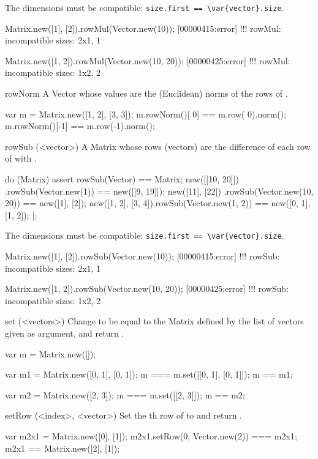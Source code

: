 \begin{urbiscriptapi}
  The dimensions must be compatible:
  \lstinline|size.first == \var{vector}.size|.
\begin{urbiscript}
Matrix.new([1], [2]).rowMul(Vector.new(10));
[00000415:error] !!! rowMul: incompatible sizes: 2x1, 1

Matrix.new([1, 2]).rowMul(Vector.new(10, 20));
[00000425:error] !!! rowMul: incompatible sizes: 1x2, 2
\end{urbiscript}


\item[rowNorm]%
  A Vector whose values are the (Euclidean) norms of the rows of \this.
\begin{urbiassert}
var m = Matrix.new([1, 2], [3, 3]);
m.rowNorm()[ 0] == m.row( 0).norm();
m.rowNorm()[-1] == m.row(-1).norm();
\end{urbiassert}


\item[rowSub](<vector>)%
  A Matrix whose rows (vectors) are the difference of each row of \this with
  .
\begin{urbiscript}
do (Matrix)
{
  assert
  {
    rowSub(Vector) == Matrix;
    new([[10, 20]])    .rowSub(Vector.new(1))      == new([[9, 19]]);
    new([11], [22])    .rowSub(Vector.new(10, 20)) == new([1], [2]);
    new([1, 2], [3, 4]).rowSub(Vector.new(1, 2))   == new([0, 1], [1, 2]);
  }
}|;
\end{urbiscript}

  The dimensions must be compatible:
  \lstinline|size.first == \var{vector}.size|.
\begin{urbiscript}
Matrix.new([1], [2]).rowSub(Vector.new(10));
[00000415:error] !!! rowSub: incompatible sizes: 2x1, 1

Matrix.new([1, 2]).rowSub(Vector.new(10, 20));
[00000425:error] !!! rowSub: incompatible sizes: 1x2, 2
\end{urbiscript}


\item[set](<vectors>)%
  Change \this to be equal to the Matrix defined by the list of vectors
  given as argument, and return \this.
\begin{urbiassert}
var m = Matrix.new([]);

var m1 = Matrix.new([0, 1], [0, 1]);
    m  ===    m.set([[0, 1], [0, 1]]);
    m  == m1;

var m2 = Matrix.new([2, 3]);
    m  ===    m.set([[2, 3]]);
    m  == m2;
\end{urbiassert}


\item[setRow](<index>, <vector>)%
  Set the th row of \this to  and return \this.
\begin{urbiassert}
var m2x1 = Matrix.new([0], [1]);
m2x1.setRow(0, Vector.new(2)) === m2x1;
m2x1 == Matrix.new([2], [1]);


\end{urbiassert}
\end{urbiscriptapi}
